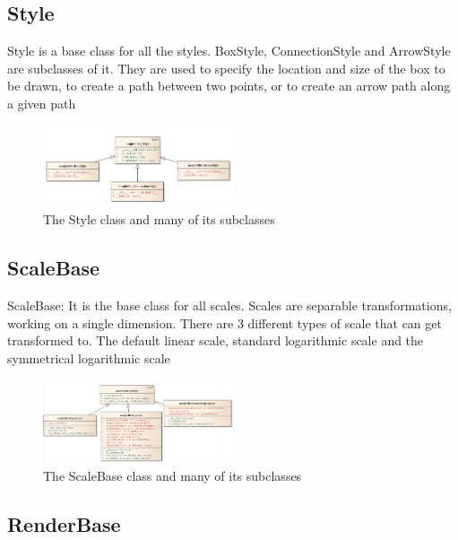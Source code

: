 \documentclass[pdftex,10pt,a4paper]{report}
\begin{document}

\subsection{Style}

Style is a base class for all the styles. BoxStyle,  ConnectionStyle and ArrowStyle are subclasses of it. They are used to specify the location and size of the box to be drawn,  to create a path between two points, or to create an arrow path along a given path

\begin{figure}[ht!]
        \centering
                \includegraphics[width=0.5\textwidth]{img/umls/candy/style}
        \caption{The Style class and many of its subclasses}
\end{figure}

\subsection{ScaleBase}

ScaleBase: It is the base class for all scales. Scales are separable transformations, working on a single dimension. There are 3 different types of scale that can get transformed to. The default linear scale,  standard logarithmic scale and the symmetrical logarithmic scale

\begin{figure}[ht!]
        \centering
                \includegraphics[width=0.5\textwidth]{img/umls/candy/Scale}
        \caption{The ScaleBase class and many of its subclasses}
\end{figure}

\subsection{RenderBase}
\end{document}
